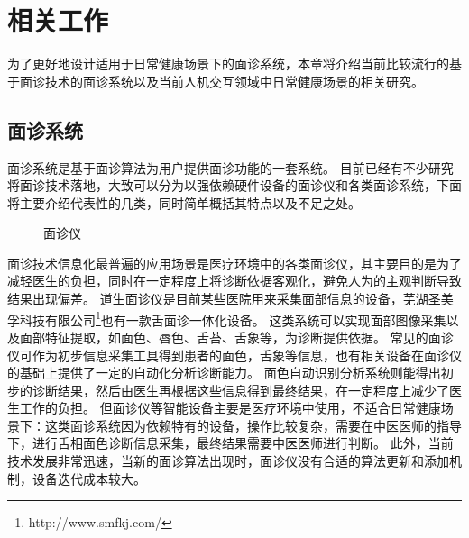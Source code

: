\chapter{相关工作}

为了更好地设计适用于日常健康场景下的面诊系统，本章将介绍当前比较流行的基于面诊技术的面诊系统以及当前人机交互领域中日常健康场景的相关研究。

\section{面诊系统}

面诊系统是基于面诊算法为用户提供面诊功能的一套系统。
目前已经有不少研究将面诊技术落地，大致可以分为以强依赖硬件设备的面诊仪和各类面诊系统，下面将主要介绍代表性的几类，同时简单概括其特点以及不足之处。

\begin{figure}[h]
    \centering
    \caption{面诊仪}
    \label{fig:med}
\end{figure}

面诊技术信息化最普遍的应用场景是医疗环境中的各类面诊仪，其主要目的是为了减轻医生的负担，同时在一定程度上将诊断依据客观化，避免人为的主观判断导致结果出现偏差。
道生面诊仪\cite{邸丹2016手持式舌象仪的研制}是目前某些医院用来采集面部信息的设备，芜湖圣美孚科技有限公司\footnote{http://www.smfkj.com/}也有一款舌面诊一体化设备。
这类系统可以实现面部图像采集以及面部特征提取，如面色、唇色、舌苔、舌象等，为诊断提供依据。
常见的面诊仪可作为初步信息采集工具得到患者的面色，舌象等信息，也有相关设备在面诊仪的基础上提供了一定的自动化分析诊断能力。
面色自动识别分析系统\cite{崔骥2018人工智能背景下中医诊疗技术的应用与展望}则能得出初步的诊断结果，然后由医生再根据这些信息得到最终结果，在一定程度上减少了医生工作的负担。
但面诊仪等智能设备主要是医疗环境中使用，不适合日常健康场景下：这类面诊系统因为依赖特有的设备，操作比较复杂，需要在中医医师的指导下，进行舌相面色诊断信息采集，最终结果需要中医医师进行判断。
此外，当前技术发展非常迅速，当新的面诊算法出现时，面诊仪没有合适的算法更新和添加机制，设备迭代成本较大。

